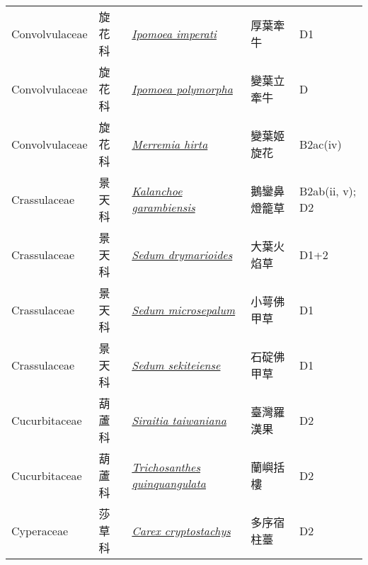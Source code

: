 {\begin{longtable}{p{2.5cm}p{2cm}p{5cm}p{2.5cm}p{3cm}}
    Convolvulaceae & 旋花科 & \href{http://www.theplantlist.org/tpl1.1/search?q=Ipomoea+imperati}{\textit{Ipomoea imperati} } & 厚葉牽牛 & D1 \index{Ipomoea@\textit{Ipomoea}!imperati@\textit{imperati}}  \index{厚葉牽牛} \\
    Convolvulaceae & 旋花科 & \href{http://www.theplantlist.org/tpl1.1/search?q=Ipomoea+polymorpha}{\textit{Ipomoea polymorpha} } & 變葉立牽牛 & D \index{Ipomoea@\textit{Ipomoea}!polymorpha@\textit{polymorpha}}  \index{變葉立牽牛} \\
    Convolvulaceae & 旋花科 & \href{http://www.theplantlist.org/tpl1.1/search?q=Merremia+hirta}{\textit{Merremia hirta} } & 變葉姬旋花 & B2ac(iv) \index{Merremia@\textit{Merremia}!hirta@\textit{hirta}}  \index{變葉姬旋花} \\
    Crassulaceae & 景天科 & \href{http://www.theplantlist.org/tpl1.1/search?q=Kalanchoe+garambiensis}{\textit{Kalanchoe garambiensis} } & 鵝鑾鼻燈籠草 & B2ab(ii, v); D2 \index{Kalanchoe@\textit{Kalanchoe}!garambiensis@\textit{garambiensis}}  \index{鵝鑾鼻燈籠草} \\
    Crassulaceae & 景天科 & \href{http://www.theplantlist.org/tpl1.1/search?q=Sedum+drymarioides}{\textit{Sedum drymarioides} } & 大葉火焰草 & D1+2 \index{Sedum@\textit{Sedum}!drymarioides@\textit{drymarioides}}  \index{大葉火焰草} \\
    Crassulaceae & 景天科 & \href{http://www.theplantlist.org/tpl1.1/search?q=Sedum+microsepalum}{\textit{Sedum microsepalum} } & 小萼佛甲草 & D1 \index{Sedum@\textit{Sedum}!microsepalum@\textit{microsepalum}}  \index{小萼佛甲草} \\
    Crassulaceae & 景天科 & \href{http://www.theplantlist.org/tpl1.1/search?q=Sedum+sekiteiense}{\textit{Sedum sekiteiense} } & 石碇佛甲草 & D1 \index{Sedum@\textit{Sedum}!sekiteiense@\textit{sekiteiense}}  \index{石碇佛甲草} \\
    Cucurbitaceae & 葫蘆科 & \href{http://www.theplantlist.org/tpl1.1/search?q=Siraitia+taiwaniana}{\textit{Siraitia taiwaniana} } & 臺灣羅漢果 & D2 \index{Siraitia@\textit{Siraitia}!taiwaniana@\textit{taiwaniana}}  \index{臺灣羅漢果} \\
    Cucurbitaceae & 葫蘆科 & \href{http://www.theplantlist.org/tpl1.1/search?q=Trichosanthes+quinquangulata}{\textit{Trichosanthes quinquangulata} } & 蘭嶼括樓 & D2 \index{Trichosanthes@\textit{Trichosanthes}!quinquangulata@\textit{quinquangulata}}  \index{蘭嶼括樓} \\
    Cyperaceae & 莎草科 & \href{http://www.theplantlist.org/tpl1.1/search?q=Carex+cryptostachys}{\textit{Carex cryptostachys} } & 多序宿柱薹 & D2 \index{Carex@\textit{Carex}!cryptostachys@\textit{cryptostachys}}  \index{多序宿柱薹} \\

\end{longtable}}
